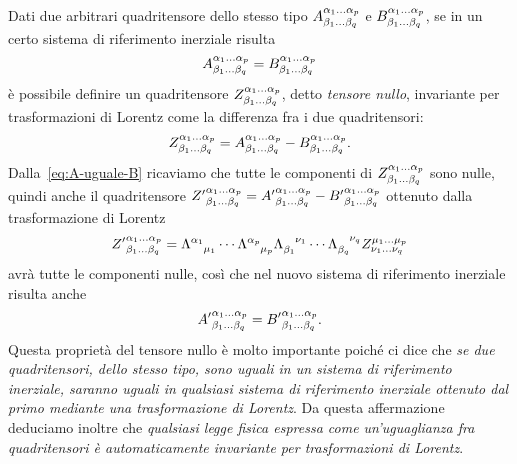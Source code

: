 Dati due arbitrari quadritensore dello stesso tipo
$\tensor*{A}{^{\alpha_{1}\dots\alpha_{p}}_{\beta_{1}\dots\beta_{q}}}$ e
$\tensor*{B}{^{\alpha_{1}\dots\alpha_{p}}_{\beta_{1}\dots\beta_{q}}}$, se in un
certo sistema di riferimento inerziale risulta
\begin{equation}
  \label{eq:A-uguale-B}
  \tensor*{A}{^{\alpha_{1}\dots\alpha_{p}}_{\beta_{1}\dots\beta_{q}}} =
  \tensor*{B}{^{\alpha_{1}\dots\alpha_{p}}_{\beta_{1}\dots\beta_{q}}}
\end{equation}
è possibile definire un quadritensore
$\tensor*{Z}{^{\alpha_{1}\dots\alpha_{p}}_{\beta_{1}\dots\beta_{q}}}$, detto
\emph{tensore nullo}, invariante per trasformazioni di
Lorentz come la differenza fra i due quadritensori:
\begin{equation}
  \tensor*{Z}{^{\alpha_{1}\dots\alpha_{p}}_{\beta_{1}\dots\beta_{q}}} =
  \tensor*{A}{^{\alpha_{1}\dots\alpha_{p}}_{\beta_{1}\dots\beta_{q}}} -
  \tensor*{B}{^{\alpha_{1}\dots\alpha_{p}}_{\beta_{1}\dots\beta_{q}}}.
\end{equation}
Dalla~\eqref{eq:A-uguale-B} ricaviamo che tutte le componenti di
$\tensor*{Z}{^{\alpha_{1}\dots\alpha_{p}}_{\beta_{1}\dots\beta_{q}}}$ sono
nulle, quindi anche il quadritensore
$\tensor*{{Z'}}{^{\alpha_{1}\dots\alpha_{p}}_{\beta_{1}\dots\beta_{q}}} =
\tensor*{{A'}}{^{\alpha_{1}\dots\alpha_{p}}_{\beta_{1}\dots\beta_{q}}} -
\tensor*{{B'}}{^{\alpha_{1}\dots\alpha_{p}}_{\beta_{1}\dots\beta_{q}}}$
ottenuto dalla trasformazione di Lorentz
\begin{equation}
  \tensor*{{Z'}}{^{\alpha_{1}\dots\alpha_{p}}_{\beta_{1}\dots\beta_{q}}} =
  \tensor{\Lambda}{^{\alpha_{1}}_{\mu_{1}}} \cdots
  \tensor{\Lambda}{^{\alpha_{p}}_{\mu_{p}}}
  \tensor{\Lambda}{_{\beta_{1}}^{\nu_{1}}} \cdots
  \tensor{\Lambda}{_{\beta_{q}}^{\nu_{q}}}
  \tensor*{Z}{^{\mu_{1}\dots\mu_{p}}_{\nu_{1}\dots\nu_{q}}}
\end{equation}
avrà tutte le componenti nulle, così che nel nuovo sistema di riferimento
inerziale risulta anche
\begin{equation}
  \tensor*{{A'}}{^{\alpha_{1}\dots\alpha_{p}}_{\beta_{1}\dots\beta_{q}}} =
  \tensor*{{B'}}{^{\alpha_{1}\dots\alpha_{p}}_{\beta_{1}\dots\beta_{q}}}.
\end{equation}
Questa proprietà del tensore nullo è molto importante poiché ci dice che
\emph{se due quadritensori, dello stesso tipo, sono uguali in un sistema di
  riferimento inerziale, saranno uguali in qualsiasi sistema di riferimento
  inerziale ottenuto dal primo mediante una trasformazione di Lorentz}.
Da questa affermazione deduciamo inoltre che\label{invarianza-lorentz}
\emph{qualsiasi legge fisica espressa come un'uguaglianza fra quadritensori è
  automaticamente invariante per trasformazioni di Lorentz}.

